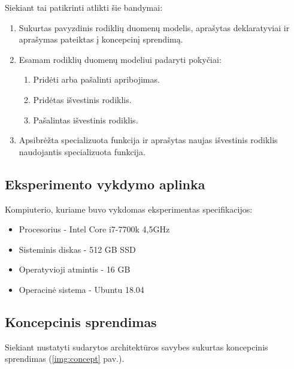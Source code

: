 \documentclass{VUMIFPSbakalaurinis}
\begin{document}
\noindent Siekiant tai patikrinti atlikti šie bandymai:
\begin{enumerate}
    \item Sukurtas pavyzdinis rodiklių duomenų modelis, aprašytas deklaratyviai ir aprašymas pateiktas į koncepcinį sprendimą.
    \item Esamam rodiklių duomenų modeliui padaryti pokyčiai:
    \begin{enumerate}
        \item Pridėti arba pašalinti apribojimas.
        \item Pridėtas išvestinis rodiklis.
        \item Pašalintas išvestinis rodiklis.
    \end{enumerate}
    \item Apsibrėžta specializuota funkcija ir aprašytas naujas išvestinis rodiklis naudojantis specializuota funkcija.
\end{enumerate}

\subsection{Eksperimento vykdymo aplinka}

Kompiuterio, kuriame buvo vykdomas eksperimentas specifikacijos:
\begin{itemize}
    \item Procesorius - Intel Core i7-7700k 4,5GHz
    \item Sisteminis diskas -  512 GB SSD
    \item Operatyvioji atmintis - 16 GB 
    \item Operacinė sistema - Ubuntu 18.04
\end{itemize}

\subsection{Koncepcinis sprendimas}

Siekiant nustatyti sudarytos architektūros savybes sukurtas koncepcinis sprendimas (\ref{img:concept} pav.).
\end{document}
